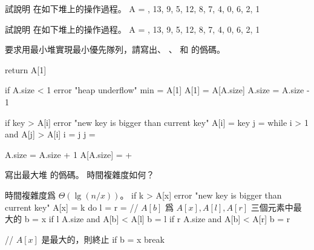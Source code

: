 \startsection[
  title={Priority queues},
]

\startEXERCISE
試說明  在如下堆上的操作過程。
\startformula
A = , 13, 9, 5, 12, 8, 7, 4, 0, 6, 2, 1 \rangle
\stopformula
\stopEXERCISE

\startANSWER
\startcombination[2*2]
{\externalfigure[output/e6_5_1-1]}{}
{\externalfigure[output/e6_5_1-2]}{}
{\externalfigure[output/e6_5_1-3]}{}
\stopcombination
\stopANSWER

\startEXERCISE
試說明  在如下堆上的操作過程。
\startformula
A = , 13, 9, 5, 12, 8, 7, 4, 0, 6, 2, 1 \rangle
\stopformula
\stopEXERCISE

\startANSWER
\startcombination[2*2]
{\externalfigure[output/e6_5_2-1]}{}
{\externalfigure[output/e6_5_2-2]}{}
{\externalfigure[output/e6_5_2-3]}{}
\stopcombination
\stopANSWER

\startEXERCISE
要求用最小堆實現最小優先隊列，請寫出、
、 和  的僞碼。
\stopEXERCISE

\startANSWER
{}
\startCLRSCODE
return A[1]
\stopCLRSCODE

\startCLRSCODE
if A.size < 1
	error "heap underflow"
min = A[1]
A[1] = A[A.size]
A.size = A.size - 1
\stopCLRSCODE

\startCLRSCODE
if key > A[i]
	error "new key is bigger than current key"
A[i] = key
j = 
while i > 1 and A[j] > A[i]
	i = j
	j = 
\stopCLRSCODE

\startCLRSCODE
A.size = A.size + 1
A[A.size] = +\infty
{}
\stopCLRSCODE
\stopANSWER

\startEXERCISE
寫出最大堆  的僞碼。
時間複雜度如何？
\stopEXERCISE

\startANSWER
時間複雜度爲 $\Theta(\lg (n/x))$。
\startCLRSCODE
if k > A[x]
	error "new key is bigger than current key"
A[x] = k
do
	l = 
	r = 
	// $A[b]$ 爲 $A[x],A[l],A[r]$ 三個元素中最大的
	b = x
	if l \le A.size and A[b] < A[l]
		b = l
	if r \le A.size and A[b] < A[r]
		b = r

	// $A[x]$ 是最大的，則終止
	if b = x
		break

